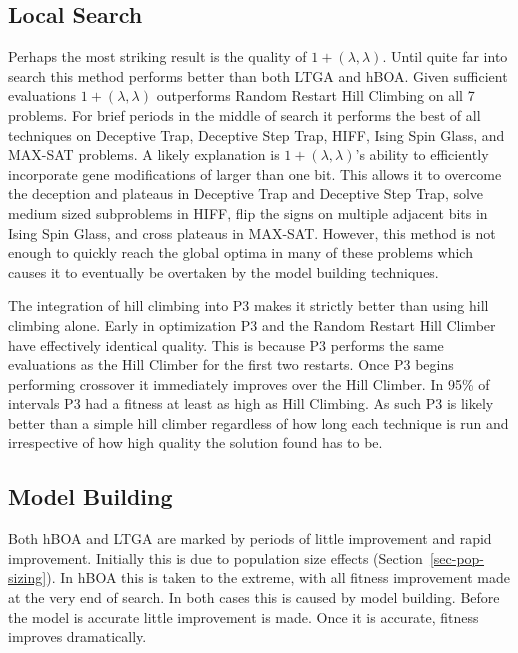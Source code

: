 \documentclass[twoside]{article}
\begin{document}
\subsection{Local Search}
Perhaps the most striking result is the quality of $1+(\lambda, \lambda)$. Until quite far into search this
method performs better than both LTGA and hBOA. Given sufficient evaluations $1+(\lambda, \lambda)$ outperforms
Random Restart Hill Climbing on all 7 problems. For brief periods in the middle of search it performs the
best of all techniques on Deceptive Trap, Deceptive Step Trap, HIFF, Ising Spin Glass, and MAX-SAT problems. A likely
explanation is $1+(\lambda, \lambda)$'s ability to efficiently incorporate gene modifications of larger
than one bit. This allows it to overcome the deception and plateaus in Deceptive Trap and Deceptive Step Trap, solve medium sized subproblems
in HIFF, flip the signs on multiple adjacent bits in Ising Spin Glass, and cross plateaus in MAX-SAT. However,
this method is not enough to quickly reach the global optima in many of these problems which causes it to eventually
be overtaken by the model building techniques.

The integration of hill climbing into P3 makes it strictly better than using hill climbing alone.
Early in optimization P3 and the Random Restart Hill Climber have effectively identical quality. This is because
P3 performs the same evaluations as the Hill Climber for the first two restarts. Once P3 begins
performing crossover it immediately improves over the Hill Climber. In 95\% of intervals P3 had a fitness at
least as high as Hill Climbing. As such P3 is likely better than a simple
hill climber regardless of how long each technique is run and irrespective of how high quality the solution
found has to be.

\subsection{Model Building}
Both hBOA and LTGA are marked by periods of little improvement and rapid improvement. Initially this is due to
population size effects (Section~\ref{sec-pop-sizing}). In hBOA this is taken to the extreme, with all fitness
improvement made at the very end of search. In both cases this is caused by model building. Before the model
is accurate little improvement is made. Once it is accurate, fitness improves dramatically.
\end{document}
